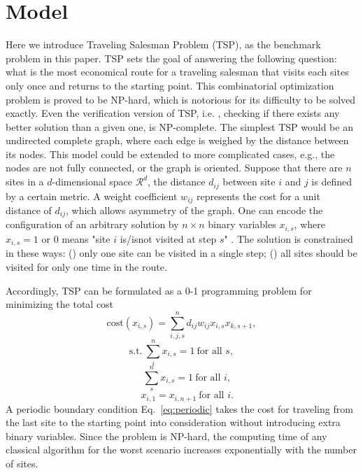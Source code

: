 \documentclass[aps,pra,twocolumn,superscriptaddress]{revtex4-2}
\begin{document}
\section{Model\label{sec:model}}
Here we introduce Traveling Salesman Problem (TSP), as the benchmark problem in this paper. TSP sets the goal of answering the following question: what is the most economical route for a traveling salesman that visits each sites only once and returns to the starting point. This combinatorial optimization problem is proved to be NP-hard, which is notorious for its difficulty to be solved exactly. Even the verification version of TSP, i.e. , checking if there exists any better solution than a given one, is NP-complete. The simplest TSP would be an undirected complete graph, where each edge is weighed by the distance between its nodes. This model could be extended to more complicated cases, e.g., the nodes are not fully connected, or the graph is oriented. Suppose that there are $n$ sites in a $d$-dimensional space $\mathcal{R}^d$, the distance $d_{ij}$ between site $i$ and $j$ is defined by a certain metric. A weight coefficient $w_{ij}$ represents the cost for a unit distance of $d_{ij}$, which allows asymmetry of the graph. One can encode the configuration of an arbitrary solution by $n\times n$ binary variables $x_{i,s}$, where $x_{i,s}=1$ or $0$ means "site $i$ is/isnot visited at step $s$" . The solution is constrained in these ways: () only one site can be visited in a single step; () all sites should be visited for only one time in the route.

Accordingly, TSP can be formulated as a 0-1 programming problem for minimizing the total cost
\begin{equation}
\label{eq:cost}
\text{cost}(x_{i,s})=\sum_{i,j,s}^n d_{ij}w_{ij}x_{i,s}x_{k,s+1},
\end{equation}
\begin{equation}
\label{eq:column}
\text{s.t.}\ \sum_i^n x_{i,s}=1\ \text{for all $s$},
\end{equation}
\begin{equation}
\label{eq:row}
\ \ \ \ \ \sum_s^n x_{i,s}=1\ \text{for all $i$},
\end{equation}
\begin{equation}
\label{eq:periodic}
\ \ \ \ \ x_{i,1}=x_{i,n+1}\ \text{for all $i$}.
\end{equation}
A periodic boundary condition Eq.~\eqref{eq:periodic} takes the cost for traveling from the last site to the starting point into consideration without introducing extra binary variables. Since the problem is NP-hard, the computing time of any classical algorithm for the worst scenario increases exponentially with the number of sites. 
\end{document}

